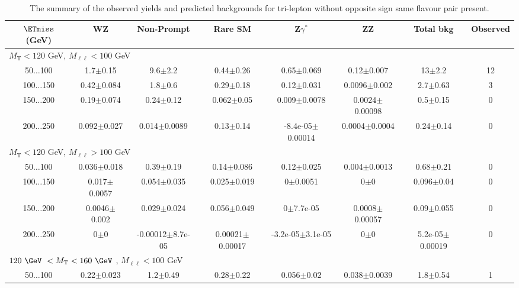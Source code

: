 \begin{landscape}
\begin{table}
\begin{center}
\begin{tabular}{| c | c c c c c c c | }
\hline\hline
\end{tabular}
\end{center}
\end{table}
\begin{table}
\small
\begin{center}
\caption{\label{tab:OSSF0tau0} The summary of the observed yields and predicted backgrounds for tri-lepton without opposite sign same flavour pair present. }
\begin{tabular}{| c | c c c c c c c | }\hline\hline
$\ETmiss$ (GeV) & WZ & Non-Prompt & Rare SM & Z$\gamma^*$ & ZZ & Total bkg & Observed\\\hline\hline
\multicolumn{8}{l}{$M_{\text{T}} < 120$ GeV, $M_{\ell\ell} < 100$ GeV}\\\hline\hline
50$\dots$100&1.7$\pm$0.15&9.6$\pm$2.2&0.44$\pm$0.26&0.65$\pm$0.069&0.12$\pm$0.007&13$\pm$2.2&12\\
100$\dots$150&0.42$\pm$0.084&1.8$\pm$0.6&0.29$\pm$0.18&0.12$\pm$0.031&0.0096$\pm$0.002&2.7$\pm$0.63&3\\
150$\dots$200&0.19$\pm$0.074&0.24$\pm$0.12&0.062$\pm$0.05&0.009$\pm$0.0078&0.0024$\pm$0.00098&0.5$\pm$0.15&0\\
200$\dots$250&0.092$\pm$0.027&0.014$\pm$0.0089&0.13$\pm$0.14&-8.4e-05$\pm$0.00014&0.0004$\pm$0.0004&0.24$\pm$0.14&0\\
\hline\hline
\multicolumn{8}{l}{$M_{\text{T}} < 120$ GeV, $M_{\ell\ell} > 100$ GeV}\\\hline\hline
50$\dots$100&0.036$\pm$0.018&0.39$\pm$0.19&0.14$\pm$0.086&0.12$\pm$0.025&0.004$\pm$0.0013&0.68$\pm$0.21&0\\
100$\dots$150&0.017$\pm$0.0057&0.054$\pm$0.035&0.025$\pm$0.019&0$\pm$0.0051&0$\pm$0&0.096$\pm$0.04&0\\
150$\dots$200&0.0046$\pm$0.002&0.029$\pm$0.024&0.056$\pm$0.049&0$\pm$7.7e-05&0.0008$\pm$0.00057&0.09$\pm$0.055&0\\
200$\dots$250&0$\pm$0&-0.00012$\pm$8.7e-05&0.00021$\pm$0.00017&-3.2e-05$\pm$3.1e-05&0$\pm$0&5.2e-05$\pm$0.00019&0\\
\hline\hline
\multicolumn{8}{l}{$120~\GeV~< M_{\text{T}} < 160~\GeV~$, $M_{\ell\ell} < 100$ GeV}\\\hline\hline
50$\dots$100&0.22$\pm$0.023&1.2$\pm$0.49&0.28$\pm$0.22&0.056$\pm$0.02&0.038$\pm$0.0039&1.8$\pm$0.54&1\\

\end{tabular}
\end{center}
\end{table}
\end{landscape}
